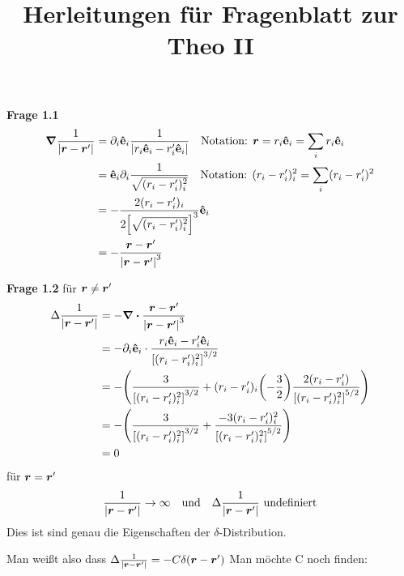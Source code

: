 
\title{Herleitungen für Fragenblatt zur Theo II}

   
  \newpage

  \textbf{Frage 1.1}
    \begin{equation*}
      \begin{split}
        \grad \frac{1}{\abs{\vb*{r}-\vb*{r}'}} 
          &= \partial_i \vu e_i \frac{1}{\abs{r_i \vu e_i - r_i' \vu e_i}}
          \quad\text{Notation: } \vb* r = r_i \vu e_i = \sum_i r_i \vu e_i\\
          &= \vu e_i \partial_i \frac{1}{\sqrt{(r_i-r_i')_i^2}}
          \quad\text{Notation: }(r_i-r'_i)^2_i=\sum_i(r_i-r'_i)^2\\
          &= 
          -\frac{2(r_i-r_i')_i}{2\qty[\sqrt{(r_i-r_i')_i^2}]^{3}}\vu e_i \\
          &= -\frac{\vb* r - \vb* r'}{\abs{\vb* r - \vb* r'}^3} 
      \end{split}
    \end{equation*}

  \textbf{Frage 1.2}
    für $\vb* r \neq \vb* r'$
    \begin{equation*}
      \begin{split}
        \Delta \frac{1}{\abs{\vb*{r}-\vb*{r}'}}
        &=-\div\frac{\vb* r - \vb* r'}{\abs{\vb* r - \vb* r'}^3}\\  
        &=-\partial_i \vu e_i \cdot 
        \frac{r_i \vu e_i - r'_i \vu e_i}
        {\qty[(r_i - r'_i)_i^2]^{3/2}}\\  
        &=-\qty(
        \frac{3}{\qty[(r_i - r'_i)_i^2]^{3/2}}
        +(r_i-r'_i)_i\qty(-\frac{3}{2})\frac{2(r_i-r'_i)}
        {{\qty[(r_i-r'_i)_i^2]}^{5/2}}
        )\\  
        &=-\qty(
        \frac{3}{\qty[(r_i-r'_i)_i^2]^{3/2}} 
        + \frac{-3(r_i-r'_i)_i^2}{\qty[(r_i-r'_i)_i^2]^{5/2}}
        )\\
        &=0
      \end{split}
    \end{equation*}
    für $\vb* r=\vb* r'$
    \begin{equation*}
      \frac{1}{\abs{\vb*{r}-\vb*{r}'}}\to \infty\quad \text{und}\quad \Delta\frac{1}{\abs{\vb*{r}-\vb*{r}'}}\ \text{undefiniert}
    \end{equation*}
    Dies ist sind genau die Eigenschaften der $\delta$-Distribution.

    Man weißt also dass $\Delta \frac{1}{\abs{\vb*{r}-\vb*{r}'}}=-C\delta(\vb* r - \vb* r')$
    Man möchte C noch finden:

